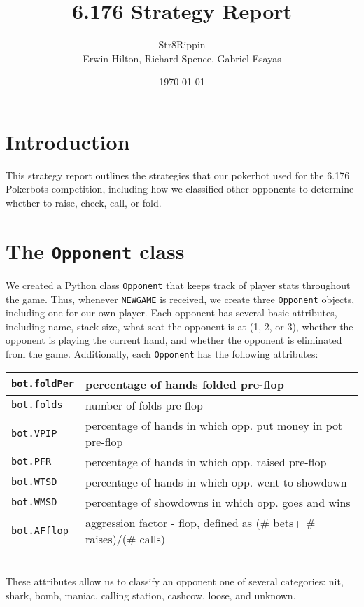 \documentclass{article}
\title{6.176 Strategy Report}
\author{Str8Rippin \\
Erwin Hilton, Richard Spence, Gabriel Esayas}
\date{\today}
\begin{document}
\maketitle

\section*{Introduction}
This strategy report outlines the strategies that our pokerbot used for the 6.176 Pokerbots competition, including how we classified other opponents to determine whether to raise, check, call, or fold.

\section*{The \texttt{Opponent} class}
We created a Python class \texttt{Opponent} that keeps track of player stats throughout the game. Thus, whenever \texttt{NEWGAME} is received, we create three \texttt{Opponent} objects, including one for our own player. Each opponent has several basic attributes, including name, stack size, what seat the opponent is at (1, 2, or 3), whether the opponent is playing the current hand, and whether the opponent is eliminated from the game. Additionally, each \texttt{Opponent} has the following attributes: \\

\begin{tabular}{|l|l|}  \hline
\texttt{bot.foldPer} & percentage of hands folded pre-flop \\ \hline
\texttt{bot.folds} & number of folds pre-flop \\ \hline
\texttt{bot.VPIP} & percentage of hands in which opp. put money in pot pre-flop  \\ \hline
\texttt{bot.PFR} & percentage of hands in which opp. raised pre-flop \\ \hline
\texttt{bot.WTSD} & percentage of hands in which opp. went to showdown \\ \hline
\texttt{bot.WMSD} & percentage of showdowns in which opp. goes and wins \\ \hline
\texttt{bot.AFflop} & aggression factor - flop, defined as (\# bets+ \# raises)/(\# calls) \\ \hline

\end{tabular} \\

These attributes allow us to classify an opponent one of several categories: nit, shark, bomb, maniac, calling station, cashcow, loose, and unknown. 
\end{document}
